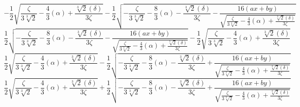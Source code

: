 \documentclass[12pt,a4paper,landscape]{amsart}
\numberwithin{equation}{section}
\theoremstyle{plain}
\theoremstyle{definition}
\begin{document}
\[
-\frac{1}{2} \sqrt{\frac{\zeta}{3 \sqrt[3]{2}}-\frac{4}{3} \left(\alpha\right)+\frac{\sqrt[3]{2} \left(\delta\right)}{3 \zeta}}-\frac{1}{2} \sqrt{-\frac{\zeta}{3 \sqrt[3]{2}}-\frac{8}{3} \left(\alpha\right)-\frac{\sqrt[3]{2} \left(\delta\right)}{3 \zeta}-\frac{16 (a x+b y)}{\sqrt{\frac{\zeta}{3 \sqrt[3]{2}}-\frac{4}{3} \left(\alpha\right)+\frac{\sqrt[3]{2} \left(\delta\right)}{3 \zeta}}}}
\]
\[
\frac{1}{2} \sqrt{-\frac{\zeta}{3 \sqrt[3]{2}}-\frac{8}{3} \left(\alpha\right)-\frac{\sqrt[3]{2} \left(\delta\right)}{3 \zeta}-\frac{16 (a x+b y)}{\sqrt{\frac{\zeta}{3 \sqrt[3]{2}}-\frac{4}{3} \left(\alpha\right)+\frac{\sqrt[3]{2} \left(\delta\right)}{3 \zeta}}}}-\frac{1}{2} \sqrt{\frac{\zeta}{3 \sqrt[3]{2}}-\frac{4}{3} \left(\alpha\right)+\frac{\sqrt[3]{2} \left(\delta\right)}{3 \zeta}}
\]
\[
\frac{1}{2} \sqrt{\frac{\zeta}{3 \sqrt[3]{2}}-\frac{4}{3} \left(\alpha\right)+\frac{\sqrt[3]{2} \left(\delta\right)}{3 \zeta}}-\frac{1}{2} \sqrt{-\frac{\zeta}{3 \sqrt[3]{2}}-\frac{8}{3} \left(\alpha\right)-\frac{\sqrt[3]{2} \left(\delta\right)}{3 \zeta}+\frac{16 (a x+b y)}{\sqrt{\frac{\zeta}{3 \sqrt[3]{2}}-\frac{4}{3} \left(\alpha\right)+\frac{\sqrt[3]{2} \left(\delta\right)}{3 \zeta}}}}
\]
\[
\frac{1}{2} \sqrt{\frac{\zeta}{3 \sqrt[3]{2}}-\frac{4}{3} \left(\alpha\right)+\frac{\sqrt[3]{2} \left(\delta\right)}{3 \zeta}}+\frac{1}{2} \sqrt{-\frac{\zeta}{3 \sqrt[3]{2}}-\frac{8}{3} \left(\alpha\right)-\frac{\sqrt[3]{2} \left(\delta\right)}{3 \zeta}+\frac{16 (a x+b y)}{\sqrt{\frac{\zeta}{3 \sqrt[3]{2}}-\frac{4}{3} \left(\alpha\right)+\frac{\sqrt[3]{2} \left(\delta\right)}{3 \zeta}}}}
\]
\end{document}
